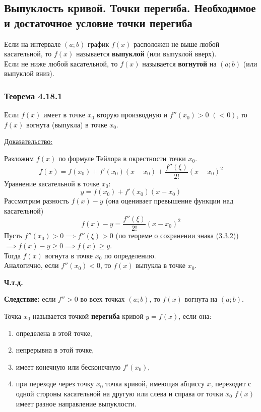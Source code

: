 \documentclass[12pt]{article}
\begin{document}
    \subsection{Выпуклость кривой. Точки перегиба. Необходимое и достаточное условие точки перегиба}\noindent
    Если на интервале $(a; b)$ график $f(x)$ расположен не выше любой касательной, то $f(x)$ называется \textbf{выпуклой} (или выпуклой вверх).\\
    Если не ниже любой касательной, то $f(x)$ называется \textbf{вогнутой} на $(a;b)$ (или выпуклой вниз).
    \subsubsection*{Теорема 4.18.1}\label{th:4.18.1}
    Если $f(x)$ имеет в точке $x_0$ вторую производную и $f''(x_0)>0$ $(<0)$, то $f(x)$ вогнута (выпукла) в точке $x_0$.\par\noindent
    \underline{Доказательство:}
    \begin{adjustwidth}{1.5em}{1.5em}
        Разложим $f(x)$ по формуле Тейлора в окрестности точки $x_0$.
        \[ f(x) = f(x_0) + f'(x_0)(x-x_0) + \frac{f''(\xi)}{2!}(x-x_0)^2 \]
        Уравнение касательной в точке $x_0$:
        \[ y = f(x_0) + f'(x_0)(x-x_0) \]
        Рассмотрим разность $f(x) - y$ (она оценивает превышение функции над касательной)
        \[ f(x) - y = \frac{f''(\xi)}{2!}(x-x_0)^2 \]
        Пусть $f''(x_0) > 0 \implies f''(\xi) > 0$ (по \hyperref[th:3.3.2]{теореме о сохранении знака (3.3.2)}) $\implies f(x) - y \ge 0 \implies f(x) \ge y$.\\
        Тогда $f(x)$ вогнута в точке $x_0$ по определению.\\
        Аналогично, если $f''(x_0) < 0$, то $f(x)$ выпукла в точке $x_0$.
        \begin{center}
            \textbf{Ч.т.д.}
        \end{center}
    \end{adjustwidth}
    \textbf{Следствие:} если $f''>0$ во всех точках $(a; b)$, то $f(x)$ вогнута на $(a; b)$.\par\noindent
    Точка $x_0$ называется точкой \textbf{перегиба} кривой $y = f(x)$, если она:
    \begin{enumerate}
        \item определена в этой точке,
        \item непрерывна в этой точке, 
        \item имеет конечную или бесконечную $f'(x_0)$, 
        \item при переходе через точку $x_0$ точка кривой, имеющая абциссу $x$, переходит с одной стороны касательной на другую или слева и справа от точки $x_0$ $f(x)$ имеет разное направление выпуклости.
    \end{enumerate}
\end{document}
